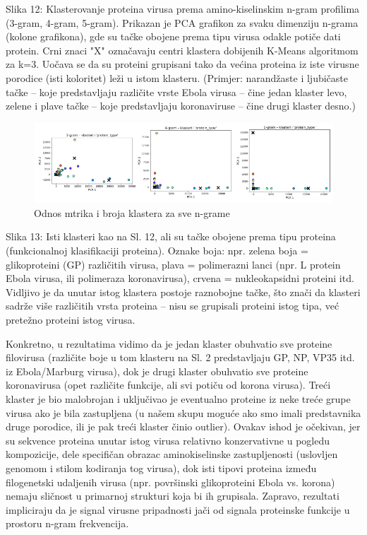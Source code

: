 \documentclass[a4paper,12pt]{article}
\begin{document}
Slika 12: Klasterovanje proteina virusa prema amino-kiselinskim n-gram profilima (3-gram, 4-gram, 5-gram). Prikazan je PCA grafikon za svaku dimenziju n-grama (kolone grafikona), gde su tačke obojene prema tipu virusa odakle potiče dati protein. Crni znaci "X" označavaju centri klastera dobijenih K-Means algoritmom za k=3. Uočava se da su proteini grupisani tako da većina proteina iz iste virusne porodice (isti koloritet) leži u istom klasteru. (Primjer: narandžaste i ljubičaste tačke – koje predstavljaju različite vrste Ebola virusa – čine jedan klaster levo, zelene i plave tačke – koje predstavljaju koronaviruse – čine drugi klaster desno.)

\begin{figure}[H]
    \centering
    \includegraphics[width=1.2\textwidth]{images/km_protein.png}
    \caption{Odnos mtrika i broja klastera za sve n-grame}
    \label{fig:km_prot}
\end{figure}


\noindent
\begin{minipage}{\textwidth}
Slika 13: Isti klasteri kao na Sl. 12, ali su tačke obojene prema tipu proteina (funkcionalnoj klasifikaciji proteina). Oznake boja: npr. zelena boja = glikoproteini (GP) različitih virusa, plava = polimerazni lanci (npr. L protein Ebola virusa, ili polimeraza koronavirusa), crvena = nukleokapsidni proteini itd. Vidljivo je da unutar istog klastera postoje raznobojne tačke, što znači da klasteri sadrže više različitih vrsta proteina – nisu se grupisali proteini istog tipa, već pretežno proteini istog virusa.
\end{minipage}

\vspace{1cm} 

Konkretno, u rezultatima vidimo da je jedan klaster obuhvatio sve proteine filovirusa (različite boje u tom klasteru na Sl. 2 predstavljaju GP, NP, VP35 itd. iz Ebola/Marburg virusa), dok je drugi klaster obuhvatio sve proteine koronavirusa (opet različite funkcije, ali svi potiču od korona virusa). Treći klaster je bio malobrojan i uključivao je eventualno proteine iz neke treće grupe virusa ako je bila zastupljena (u našem skupu moguće ako smo imali predstavnika druge porodice, ili je pak treći klaster činio outlier). Ovakav ishod je očekivan, jer su sekvence proteina unutar istog virusa relativno konzervativne u pogledu kompozicije, dele specifičan obrazac aminokiselinske zastupljenosti (uslovljen genomom i stilom kodiranja tog virusa), dok isti tipovi proteina između filogenetski udaljenih virusa (npr. površinski glikoproteini Ebola vs. korona) nemaju sličnost u primarnoj strukturi koja bi ih grupisala. Zapravo, rezultati impliciraju da je signal virusne pripadnosti jači od signala proteinske funkcije u prostoru n-gram frekvencija.
\end{document}
